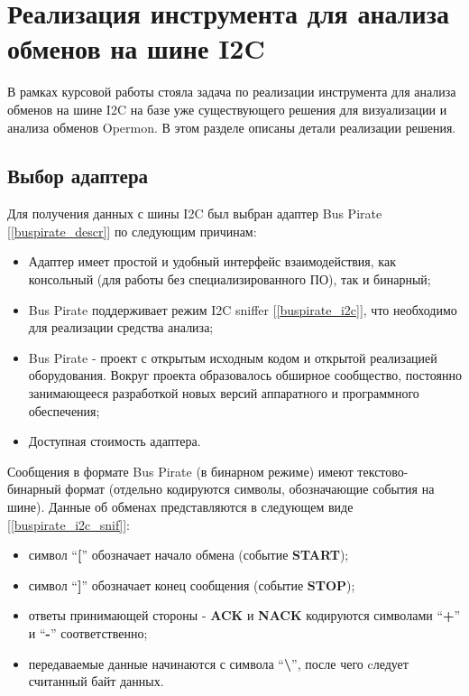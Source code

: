 \section{Реализация инструмента для анализа обменов на шине I2C}

\label{implementation}

В рамках курсовой работы стояла задача по реализации инструмента для анализа обменов на шине I2C на базе уже существующего решения для визуализации и анализа обменов Opermon. В этом разделе описаны детали реализации решения.

\subsection{Выбор адаптера}

Для получения данных с шины I2C был выбран адаптер Bus Pirate [\ref{buspirate_descr}] по следующим причинам:

\begin{itemize}
 \item Адаптер имеет простой и удобный интерфейс взаимодействия, как консольный (для работы без специализированного ПО), так и бинарный;
 \item Bus Pirate поддерживает режим I2C sniffer [\ref{buspirate_i2c}], что необходимо для реализации средства анализа;
 \item Bus Pirate - проект с открытым исходным кодом и открытой реализацией оборудования. Вокруг проекта образовалось обширное сообщество, постоянно занимающееся разработкой новых версий аппаратного и программного обеспечения;
 \item Доступная стоимость адаптера.
\end{itemize}

Сообщения в формате Bus Pirate (в бинарном режиме) имеют текстово-бинарный формат (отдельно кодируются символы, обозначающие события на шине). Данные об обменах представляются в следующем виде [\ref{buspirate_i2c_snif}]:

\begin{itemize}
 \item символ ``\textbf{[}'' обозначает начало обмена (событие \textbf{START});
 \item символ ``\textbf{]}'' обозначает конец сообщения (событие \textbf{STOP});
 \item ответы принимающей стороны - \textbf{ACK} и \textbf{NACK} кодируются символами ``\textbf{+}'' и ``\textbf{-}'' соответственно;
 \item передаваемые данные начинаются с символа ``\textbf{\textbackslash}'', после чего cледует считанный байт данных.
\end{itemize}

